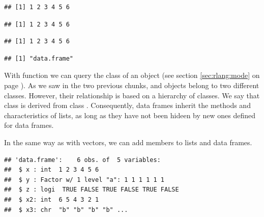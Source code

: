\documentclass[krantz2]{krantz}\usepackage{knitr}%
\begin{document}
\begin{knitrout}\footnotesize
{}\color{fgcolor}\begin{kframe}
\begin{alltt}
\hlopt{$}
\end{alltt}
\begin{verbatim}
## [1] 1 2 3 4 5 6
\end{verbatim}
\begin{alltt}
\hlstd{a.df[[}\hlstd{]]}
\end{alltt}
\begin{verbatim}
## [1] 1 2 3 4 5 6
\end{verbatim}
\begin{alltt}
\hlstd{a.df[[}\hlstd{]]}
\end{alltt}
\begin{verbatim}
## [1] 1 2 3 4 5 6
\end{verbatim}
\begin{alltt}
\end{alltt}
\begin{verbatim}
## [1] "data.frame"
\end{verbatim}
\end{kframe}
\end{knitrout}

With function  we can query the class of an \Rlang object (see section \ref{sec:rlang:mode} on page \pageref{sec:rlang:mode}). As we saw in the two previous chunks,  and  objects belong to two different classes. However, their relationship is based on a hierarchy of classes. We say that class  is derived from class . Consequently, data frames inherit the methods and characteristics of lists, as long as they have not been hideen by new ones defined for data frames.

In the same way as with vectors, we can add members to lists and data frames.

\begin{knitrout}\footnotesize
{}\color{fgcolor}\begin{kframe}
\begin{alltt}
\hlopt{$} \hlkwb{<-} \hlopt{:}
\hlopt{$} \hlkwb{<-} 
\end{alltt}
\begin{verbatim}
## 'data.frame':	6 obs. of  5 variables:
##  $ x : int  1 2 3 4 5 6
##  $ y : Factor w/ 1 level "a": 1 1 1 1 1 1
##  $ z : logi  TRUE FALSE TRUE FALSE TRUE FALSE
##  $ x2: int  6 5 4 3 2 1
##  $ x3: chr  "b" "b" "b" "b" ...
\end{verbatim}
\end{kframe}
\end{knitrout}
\end{document}
